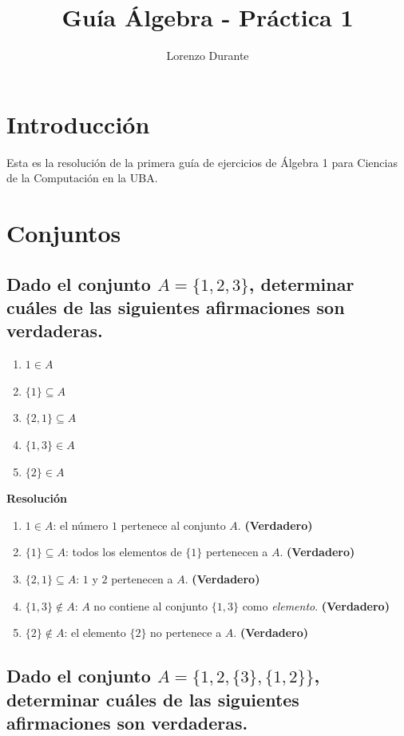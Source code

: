 \documentclass[11pt]{article}
\title{\textbf{Guía Álgebra - Práctica 1}}
\author{Lorenzo Durante}
\date{}
\begin{document}
\maketitle

\section{Introducción}
Esta es la resolución de la primera guía de ejercicios de Álgebra 1 para Ciencias de la Computación en la UBA.

\section{Conjuntos}
\subsection{Dado el conjunto \(A = \{ 1, 2, 3\}\), determinar cuáles de las siguientes afirmaciones son verdaderas.}

\begin{enumerate}[label=\roman*)]
    \item \(1 \in A\)
    \item \(\{1\} \subseteq A\)
    \item \(\{2,1\} \subseteq A\)
    \item \(\{1,3\} \in A\)
    \item \(\{2\} \in A\)
\end{enumerate}

\textbf{Resolución}

\begin{enumerate}[label=\roman*)]
    \item \(1 \in A\): el número \(1\) pertenece al conjunto \(A\). \textbf{(Verdadero)}
    \item \(\{1\} \subseteq A\): todos los elementos de \(\{1\}\) pertenecen a \(A\). \textbf{(Verdadero)}
    \item \(\{2,1\} \subseteq A\): \(1\) y \(2\) pertenecen a \(A\). \textbf{(Verdadero)}
    \item \(\{1,3\} \notin A\): \(A\) no contiene al conjunto \(\{1,3\}\) como \emph{elemento}. \textbf{(Verdadero)}
    \item \(\{2\} \notin A\): el elemento \(\{2\}\) no pertenece a \(A\). \textbf{(Verdadero)}
\end{enumerate}

\subsection{Dado el conjunto \(A = \{1, 2, \{3\}, \{1,2\}\}\), determinar cuáles de las siguientes afirmaciones son verdaderas.}
\end{document}
